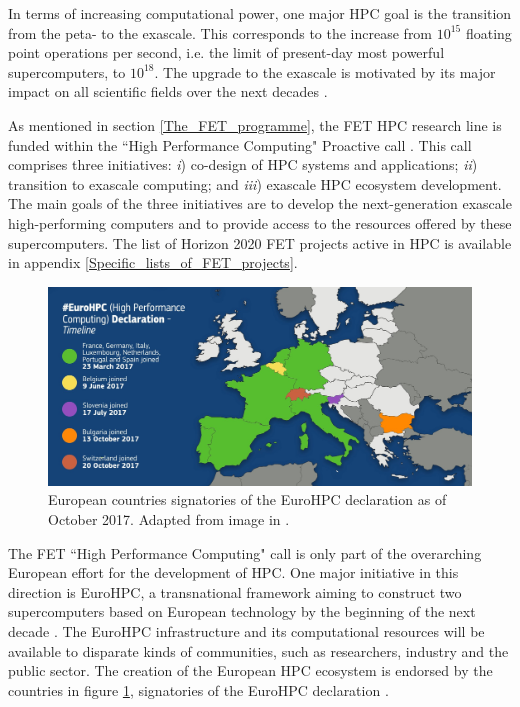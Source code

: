In terms of increasing computational power, one major HPC goal is the transition from the peta- to the exascale. This corresponds to the increase from $10^{15}$ floating point operations per second, i.e. the limit of present-day most powerful supercomputers, to $10^{18}$. The upgrade to the exascale is motivated by its major impact on all scientific fields over the next decades \cite{Vetter}. 

As mentioned in section \ref{The_FET_programme}, the FET HPC research line is funded within the ``High Performance Computing" Proactive call \cite{HPC}. This call comprises three initiatives: \textit{i}) co-design of HPC systems and applications; \textit{ii}) transition to exascale computing; and \textit{iii}) exascale HPC ecosystem development. The main goals of the three initiatives are to develop the next-generation exascale high-performing computers and to provide access to the resources offered by these supercomputers. The list of Horizon 2020 FET projects active in HPC is available in appendix \ref{Specific_lists_of_FET_projects}.

\begin{figure}[!t] 
 \begin{center}
 \includegraphics[scale=0.23]{Images/EuroHPC.jpg}
 \caption{European countries signatories of the EuroHPC declaration as of October 2017. Adapted from image in \cite{EuroHPC_countries}.}
 \label{EuroHPC_image}
 \end{center}
\end{figure}

The FET ``High Performance Computing" call is only part of the overarching European effort for the development of HPC. One major initiative in this direction is EuroHPC, a transnational framework aiming to construct two supercomputers based on European technology by the beginning of the next decade \cite{EuroHPC}. The EuroHPC infrastructure and its computational resources will be available to disparate kinds of communities, such as researchers, industry and the public sector. The creation of the European HPC ecosystem is endorsed by the countries in figure \ref{EuroHPC_image}, signatories of the EuroHPC declaration \cite{EuroHPC_declaration}.  

